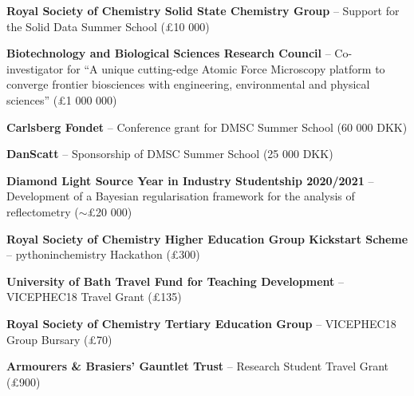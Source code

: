 \begin{cventriesy}
  \cventryy
    {
      \begin{cvitems}
        \item {\textbf{Royal Society of Chemistry Solid State Chemistry Group} -- Support for the Solid Data Summer School (£10 000)}
        \vspace{1mm}
        \item {\textbf{Biotechnology and Biological Sciences Research Council} -- Co-investigator for ``A unique cutting-edge Atomic Force Microscopy platform to converge frontier biosciences with engineering, environmental and physical sciences'' (£1 000 000)}
        \vspace{1mm}
        \item {\textbf{Carlsberg Fondet} -- Conference grant for DMSC Summer School (60 000 DKK)}
        \vspace{1mm}
        \item {\textbf{DanScatt} -- Sponsorship of DMSC Summer School (25 000 DKK)}
        \vspace{1mm}
        \item {\textbf{Diamond Light Source Year in Industry Studentship 2020/2021} -- Development of a Bayesian regularisation framework for the analysis of reflectometry ($\sim$£20 000)}
        \vspace{1mm}
        \item {\textbf{Royal Society of Chemistry Higher Education Group Kickstart Scheme} -- pythoninchemistry Hackathon (£300)}
        \vspace{1mm}
        \item {\textbf{University of Bath Travel Fund for Teaching Development} -- VICEPHEC18 Travel Grant (£135)}
        \vspace{1mm}
        \item {\textbf{Royal Society of Chemistry Tertiary Education Group} -- VICEPHEC18 Group Bursary (£70)}
        \vspace{1mm}
        \item {\textbf{Armourers \& Brasiers’ Gauntlet Trust} -- Research Student Travel Grant (£900)}
      \end{cvitems}
    }
\end{cventriesy}
